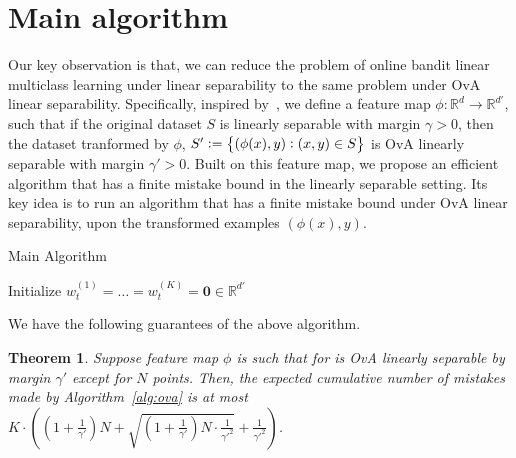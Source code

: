 \documentclass{article}
\newcommand{\field}[1]{\mathbb{#1}}
\newcommand{\fR}{\field{R}}
\newtheorem{theorem}{Theorem}
\begin{document}
\section{Main algorithm}
Our key observation is that, we can reduce the problem of online bandit linear multiclass learning under linear separability to the same problem under OvA linear separability. Specifically, inspired by~\cite{klivans2004learning}, we define
a feature map $\phi: \fR^d \to \fR^{d'}$, such that if the original dataset $S$ is linearly separable with margin $\gamma > 0$, then the dataset tranformed by $\phi$, $S' := \cbr{(\phi(x), y): (x,y) \in S}$ is OvA linearly separable with margin $\gamma' > 0$. Built on this feature map, we propose an efficient algorithm that has a finite mistake bound in the linearly separable setting. Its key idea is to 
run an algorithm that has a finite mistake bound under OvA linear separability, upon the transformed examples $(\phi(x), y)$. 


\begin{algorithm}[H]
\caption{Main Algorithm}
\label{alg:ova}
Initialize $w_t^{(1)}=\ldots=w_t^{(K)}=\mathbf{0}\in \mathbb{R}^{d'}$\\
\end{algorithm}

We have the following guarantees of the above algorithm.
\begin{theorem}
Suppose feature map $\phi$ is such that for  is OvA linearly separable by margin $\gamma'$ except for $N$ points. Then, 
the expected cumulative number of mistakes made by Algorithm~\ref{alg:ova} is at most $K \cdot ( (1 + \frac 1 {\gamma'}) N + \sqrt{ (1 + \frac 1 {\gamma'}) N \cdot \frac{1}{\gamma'^2} } + \frac{1}{\gamma'^2})$.
\end{theorem}
\end{document}
